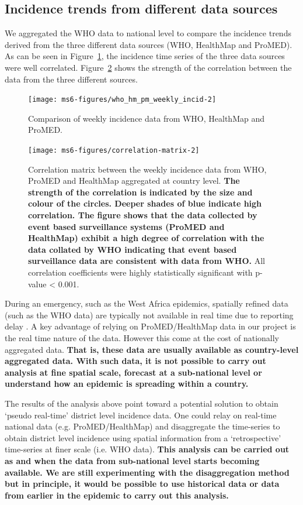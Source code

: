 \documentclass[11pt,]{article}
\begin{document}
\subsection{Incidence trends from different data sources}
We aggregated the WHO data to national level to compare the incidence
trends derived from the three different data sources (WHO, HealthMap
and ProMED). As can be seen in Figure~\ref{fig:incid_comp}, the incidence time series
of the three data sources were well
correlated. Figure~\ref{fig:corrplot} shows the strength of the
correlation between the data from the three different sources.

\begin{figure}
    \centering
        \texttt{[image: ms6-figures/who\_hm\_pm\_weekly\_incid-2]}
        \caption{Comparison of weekly incidence data from WHO, HealthMap and ProMED.}
        \label{fig:incid_comp}
  \end{figure}


  \begin{figure}
    \centering
    \texttt{[image: ms6-figures/correlation-matrix-2]}
    \caption{Correlation matrix between the weekly incidence data from WHO,
      ProMED and HealthMap aggregated at country level. \textbf{The strength of the correlation is
      indicated by the size and colour of the circles.
      Deeper shades of blue indicate high correlation. The figure
      shows that the data collected by event based surveillance
      systems (ProMED and HealthMap) exhibit a
      high degree of correlation with the data collated by WHO
      indicating that  event based surveillance data are consistent with data
      from WHO.} All
      correlation coefficients were  highly statistically significant
      with p-value < 0.001.}
    \label{fig:corrplot}
  \end{figure}
During an emergency, such as the West Africa epidemics, spatially refined data (such as the WHO data)
are typically not available in real time due to reporting delay \citep{cori2017key}. A key advantage 
of relying on ProMED/HealthMap data in our project is the real time nature of the data. However this come at the cost
of nationally aggregated data. \textbf{That is, these data are usually
available as country-level aggregated data.  With such data, it is not possible to carry out analysis at
fine spatial scale, forecast at a sub-national level or understand how an
epidemic is spreading within a country.}

The results of the analysis above point toward a potential solution to obtain `pseudo real-time' district
 level incidence data. One could relay on real-time national data (e.g. ProMED/HealthMap) and disaggregate 
the time-series to obtain district level incidence using spatial information from a `retrospective'
time-series at finer scale (i.e. WHO data). \textbf{This analysis can
 be carried out as and when the data from sub-national level starts
 becoming available. We are still experimenting with the
 disaggregation method  but in
 principle, it would be possible to use historical data or data from
 earlier in the epidemic to carry out
 this analysis.}
\FloatBarrier
\end{document}
